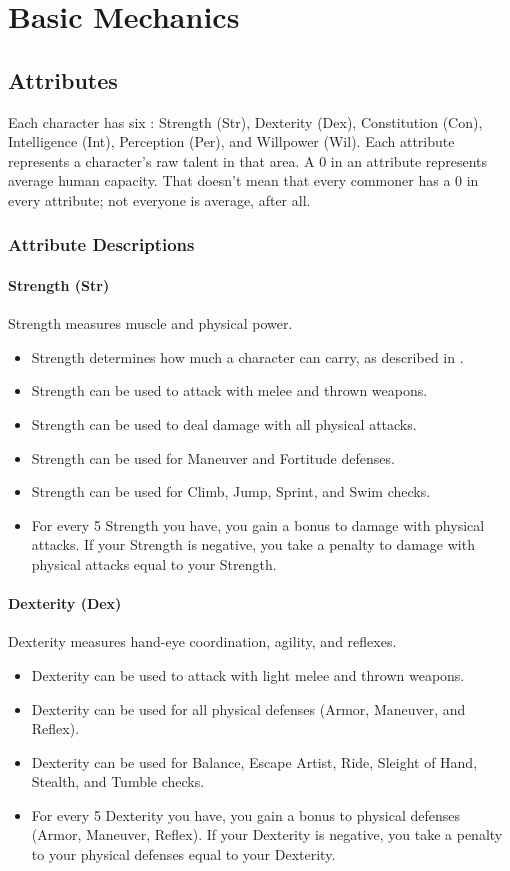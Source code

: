 \chapter{Basic Mechanics}

\section{Attributes}
Each character has six : Strength (Str), Dexterity (Dex), Constitution (Con), Intelligence (Int), Perception (Per), and Willpower (Wil).
Each attribute represents a character's raw talent in that area.
A 0 in an attribute represents average human capacity.
That doesn't mean that every commoner has a 0 in every attribute; not everyone is average, after all.

\subsection{Attribute Descriptions}

\subsubsection{Strength (Str)}\label{Strength}
Strength measures muscle and physical power.
\begin{itemize}
    \item Strength determines how much a character can carry, as described in .
    \item Strength can be used to attack with melee and thrown weapons.
    \item Strength can be used to deal damage with all physical attacks.
    \item Strength can be used for Maneuver and Fortitude defenses.
    \item Strength can be used for Climb, Jump, Sprint, and Swim checks.
    \item For every 5 Strength you have, you gain a  bonus to damage with physical attacks. If your Strength is negative, you take a penalty to damage with physical attacks equal to your Strength.
\end{itemize}

\subsubsection{Dexterity (Dex)}\label{Dexterity}
Dexterity measures hand-eye coordination, agility, and reflexes.
\begin{itemize}
    \item Dexterity can be used to attack with light melee and thrown weapons.
    \item Dexterity can be used for all physical defenses (Armor, Maneuver, and Reflex).
    \item Dexterity can be used for Balance, Escape Artist, Ride, Sleight of Hand, Stealth, and Tumble checks.
    \item For every 5 Dexterity you have, you gain a  bonus to physical defenses (Armor, Maneuver, Reflex). If your Dexterity is negative, you take a penalty to your physical defenses equal to your Dexterity.
\end{itemize}

